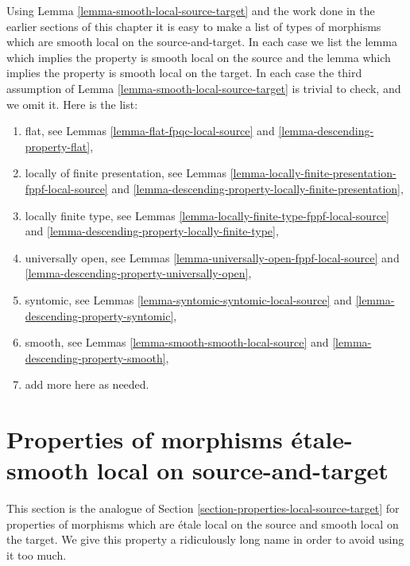 \begin{remark}
\label{remark-list-local-source-target}
Using
Lemma \ref{lemma-smooth-local-source-target}
and the work done in the earlier sections of this chapter it is easy
to make a list of types of morphisms which are smooth local on the
source-and-target. In each case we list the lemma which implies
the property is smooth local on the source and the lemma which implies
the property is smooth local on the target. In each case the third assumption
of
Lemma \ref{lemma-smooth-local-source-target}
is trivial to check, and we omit it. Here is the list:
\begin{enumerate}
\item flat, see
Lemmas \ref{lemma-flat-fpqc-local-source} and
\ref{lemma-descending-property-flat},
\item locally of finite presentation, see
Lemmas \ref{lemma-locally-finite-presentation-fppf-local-source} and
\ref{lemma-descending-property-locally-finite-presentation},
\item locally finite type, see
Lemmas \ref{lemma-locally-finite-type-fppf-local-source} and
\ref{lemma-descending-property-locally-finite-type},
\item universally open, see
Lemmas \ref{lemma-universally-open-fppf-local-source} and
\ref{lemma-descending-property-universally-open},
\item syntomic, see
Lemmas \ref{lemma-syntomic-syntomic-local-source} and
\ref{lemma-descending-property-syntomic},
\item smooth, see
Lemmas \ref{lemma-smooth-smooth-local-source} and
\ref{lemma-descending-property-smooth},
\item add more here as needed.
\end{enumerate}
\end{remark}







\section{Properties of morphisms \'etale-smooth local on source-and-target}
\label{section-properties-etale-smooth-local-source-target}

\noindent
This section is the analogue of
Section \ref{section-properties-local-source-target}
for properties of morphisms which are \'etale local
on the source and smooth local on the target.
We give this property a ridiculously long name
in order to avoid using it too much.

